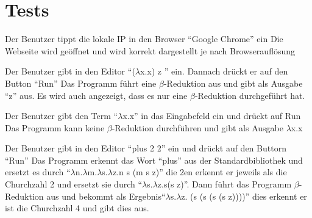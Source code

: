 \documentclass[parskip=full,11pt,twoside]{scrartcl}
\begin{document}
\newpage
\section{Tests}


{Der Benutzer tippt die lokale IP in den Browser \enquote {Google Chrome} ein }
{ Die Webseite wird geöffnet und wird korrekt dargestellt je nach Browserauflösung}




{ Der Benutzer gibt in den Editor \enquote {($\lambda$x.x) z } ein. Dannach drückt er auf den Button \enquote {Run}}
{ Das Programm führt eine $\beta$-Reduktion aus und gibt als Ausgabe \enquote {z} aus. Es wird auch angezeigt, dass es nur eine $\beta$-Reduktion durchgeführt hat.}

{Der Benutzer gibt den Term \enquote {$\lambda$x.x} in das Eingabefeld ein und drückt auf Run}
{Das Programm kann keine $\beta$-Reduktion durchführen und gibt als Ausgabe $\lambda$x.x}

{Der Benutzer gibt in den Editor \enquote {plus 2 2} ein und drückt auf den Buttorn \enquote {Run}}
{ Das Programm erkennt das Wort \enquote {plus} aus der Standardbibliothek und ersetzt es durch \enquote {$\lambda$n.$\lambda$m.$\lambda$s.$\lambda$z.n s (m s z)} die 2en erkennt er jeweils als die Churchzahl 2 und ersetzt sie durch \enquote {$\lambda$s.$\lambda$z.s(s z)}. Dann führt das Programm $\beta$-Reduktion aus und bekommt als Ergebnis\enquote {$\lambda$s.$\lambda$z. (s (s (s (s z))))} dies erkennt er ist die Churchzahl 4 und gibt dies aus. }
\end{document}
